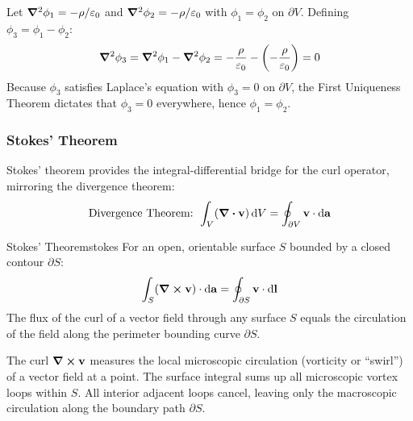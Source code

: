 \begin{proofbox}[Proof]
Let $\grad^2\phi_1 = -\rho/\varepsilon_0$ and $\grad^2\phi_2 = -\rho/\varepsilon_0$ with $\phi_1 = \phi_2$ on $\partial V$. Defining $\phi_3 = \phi_1 - \phi_2$:
\begin{equation}
    \grad^2\phi_3 = \grad^2\phi_1 - \grad^2\phi_2 = -\frac{\rho}{\varepsilon_0} - \left(-\frac{\rho}{\varepsilon_0}\right) = 0
\end{equation}
Because $\phi_3$ satisfies Laplace's equation with $\phi_3 = 0$ on $\partial V$, the First Uniqueness Theorem dictates that $\phi_3 = 0$ everywhere, hence $\phi_1 = \phi_2$.
\end{proofbox}

\subsubsection{Stokes' Theorem}

Stokes' theorem provides the integral-differential bridge for the curl operator, mirroring the divergence theorem:
\begin{equation}
    \text{Divergence Theorem: } \int_V (\div{\vb{v}}) \dd{V} = \oint_{\partial V} \vb{v} \cdot \dd{\vb{a}}
\end{equation}

\begin{theorem}{Stokes' Theorem}{stokes}
For an open, orientable surface $S$ bounded by a closed contour $\partial S$:
\begin{equation}
    \int_S (\curl{\vb{v}}) \cdot \dd{\vb{a}} = \oint_{\partial S} \vb{v} \cdot \dd{\vb{l}}
\end{equation}
The flux of the curl of a vector field through any surface $S$ equals the circulation of the field along the perimeter bounding curve $\partial S$.
\end{theorem}

\begin{remark}
The curl $\curl{\vb{v}}$ measures the local microscopic circulation (vorticity or ``swirl'') of a vector field at a point. The surface integral sums up all microscopic vortex loops within $S$. All interior adjacent loops cancel, leaving only the macroscopic circulation along the boundary path $\partial S$.
\end{remark}

